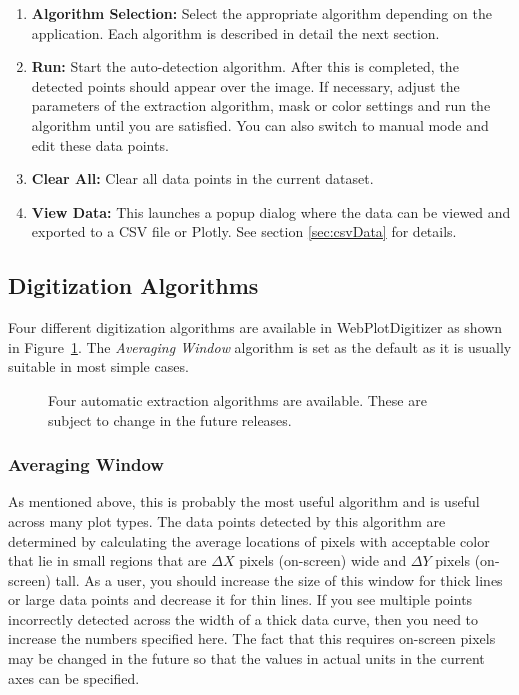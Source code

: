 \documentclass[letterpaper, 11pt]{article}
\begin{document}
\begin{enumerate}
\begin{enumerate}
\end{enumerate}
\item{{\bf Algorithm Selection: }Select the appropriate algorithm depending on the application. Each algorithm is described in detail the next section.}
\item{{\bf Run: }Start the auto-detection algorithm. After this is completed, the detected points should appear over the image. If necessary, adjust the parameters of the extraction algorithm, mask or color settings and run the algorithm until you are satisfied. You can also switch to manual mode and edit these data points.}
\item{{\bf Clear All: }Clear all data points in the current dataset.}
\item{{\bf View Data: }This launches a popup dialog where the data can be viewed and exported to a CSV file or Plotly. See section \ref{sec:csvData} for details.}
\end{enumerate}

\subsection{Digitization Algorithms}
Four different digitization algorithms are available in WebPlotDigitizer as shown in Figure~\ref{fig:autoExtractAlgos}. The \emph{Averaging Window} algorithm is set as the default as it is usually suitable in most simple cases.
\begin{figure}
\begin{center}
\caption{Four automatic extraction algorithms are available. These are subject to change in the future releases.}
\label{fig:autoExtractAlgos}
\end{center}
\end{figure}
\subsubsection{Averaging Window}
As mentioned above, this is probably the most useful algorithm and is useful across many plot types. The data points detected by this algorithm are determined by calculating the average locations of pixels with acceptable color that lie in small regions that are $\Delta X$ pixels (on-screen) wide and $\Delta Y$ pixels (on-screen) tall. As a user, you should increase the size of this window for thick lines or large data points and decrease it for thin lines. If you see multiple points incorrectly detected across the width of a thick data curve, then you need to increase the numbers specified here. The fact that this requires on-screen pixels may be changed in the future so that the values in actual units in the current axes can be specified.
\end{document}
